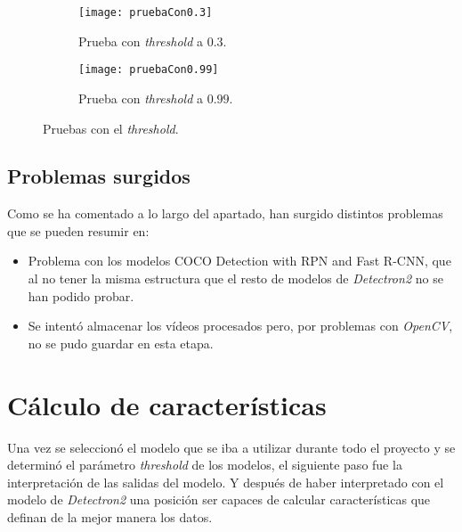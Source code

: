 {\begin{figure}[ht]
	\begin{subfigure}{.48\textwidth}
		\centering
		\texttt{[image: pruebaCon0.3]}
		\caption{Prueba con \textit{threshold} a $0.3$.}
		\label{fig:pruebaCon0.3}
	\end{subfigure}
	\begin{subfigure}{.48\textwidth}
		\centering
		\texttt{[image: pruebaCon0.99]}
		\caption{Prueba con \textit{threshold} a $0.99$.}
		\label{fig:pruebaCon0.99}
	\end{subfigure}
	\caption{Pruebas con el \textit{threshold}.}
	\label{fig:thr}
\end{figure}

\subsection{Problemas surgidos}
Como se ha comentado a lo largo del apartado, han surgido distintos problemas que se pueden resumir en:
\begin{itemize}
	\item Problema con los modelos COCO Detection with RPN and Fast R-CNN, que al no tener la misma estructura que el resto de modelos de \textit{Detectron2} no se han podido probar.
	\item Se intentó almacenar los vídeos procesados pero, por problemas con \textit{OpenCV}, no se pudo guardar en esta etapa.
\end{itemize}

\section{Cálculo de características}
Una vez se seleccionó el modelo que se iba a utilizar durante todo el proyecto y se determinó el parámetro \textit{threshold} de los modelos, el siguiente paso fue la interpretación de las salidas del modelo. Y después de haber interpretado con el modelo de \textit{Detectron2} una posición ser capaces de calcular características que definan de la mejor manera los datos.
}
